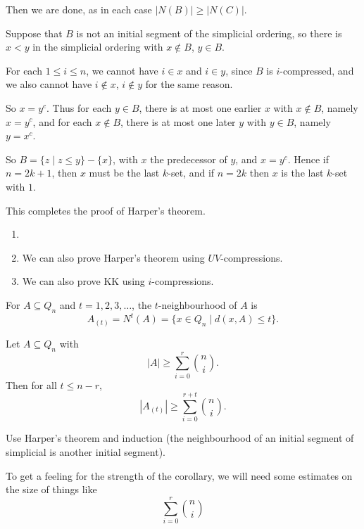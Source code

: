 \documentclass[12pt]{article}
\begin{document}
Then we are done, as in each case $|N(B)| \geq |N(C)|$.

\begin{proofbox}
	Suppose that $B$ is not an initial segment of the simplicial ordering, so there is $x < y$ in the simplicial ordering with $x\not \in B$, $y \in B$.

	For each $1 \leq i \leq n$, we cannot have $i \in x$ and $i \in y$, since $B$ is $i$-compressed, and we also cannot have $i \not \in x$, $i \not \in y$ for the same reason.

	So $x = y^{c}$. Thus for each $y \in B$, there is at most one earlier $x$ with $x \not \in B$, namely $x = y^{c}$, and for each $x \not \in B$, there is at most one later $y$ with $y \in B$, namely $y = x^{c}$.

	So $B = \{z \mid z \leq y\} - \{x\}$, with $x$ the predecessor of $y$, and $x = y^{c}$. Hence if $n = 2k+1$, then $x$ must be the last $k$-set, and if $n = 2k$ then $x$ is the last $k$-set with $1$.
\end{proofbox}

This completes the proof of Harper's theorem.

\begin{remark}
	\begin{enumerate}
		\item[]
		\item We can also prove Harper's theorem using $UV$-compressions.
		\item We can also prove KK using $i$-compressions.
	\end{enumerate}
\end{remark}

For $A \subseteq Q_n$ and $t = 1, 2, 3, \ldots$, the $t$-neighbourhood of $A$ is
\[
	A_{(t)} = N^{t}(A) = \{x \in Q_n \mid d(x, A) \leq t\}.
\]

\begin{corollary}
	Let $A \subseteq Q_n$ with
	\[
	|A| \geq \sum_{i = 0}^r \binom ni.
	\]
	Then for all $t \leq n - r$,
	\[
	|A_{(t)}| \geq \sum_{i = 0}^{r + t} \binom ni.
	\]
\end{corollary}

\begin{proofbox}
	Use Harper's theorem and induction (the neighbourhood of an initial segment of simplicial is another initial segment).
\end{proofbox}

To get a feeling for the strength of the corollary, we will need some estimates on the size of things like
\[
\sum_{i = 0}^{r} \binom ni
\]
\end{document}
